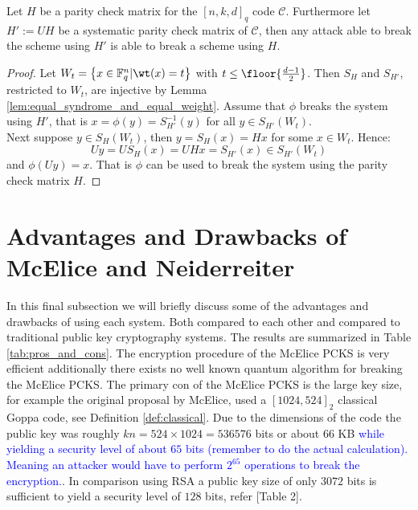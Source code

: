 \begin{proposition}\label{prop:H_can_be_in_standard_form}
  Let $H$ be a parity check matrix for the $[n, k, d]_q$ code $\mathcal{C}$. Furthermore let $H' := UH$ be a systematic parity check matrix of $\mathcal{C}$, then any attack able to break the scheme using $H'$ is able to break a scheme using $H$.
\end{proposition}
\begin{proof}
  Let $W_t = \left\{x \in \mathbb{F}_q^n | \wt(x) = t\right\}$ with $t \leq \floor{\frac{d - 1}{2}}$. Then $S_H$ and $S_{H'}$, restricted to $W_{t}$, are injective by Lemma \ref{lem:equal_syndrome_and_equal_weight}. Assume that $\phi$ breaks the system using $H'$, that is $x = \phi(y) = S_{H'}^{-1}(y)$ for all $y \in S_{H'}(W_t)$. \\
  Next suppose $y \in S_{H}(W_t)$, then $y = S_{H}(x) = Hx$ for some $x \in W_t$. Hence:
  \begin{equation*}
    Uy = U S_H(x) = U H x = S_{H'}(x) \in S_{H'}(W_t)
  \end{equation*}
   and $\phi(Uy) = x$. That is $\phi$ can be used to break the system using the parity check matrix $H$.
\end{proof}

\section{Advantages and Drawbacks of McElice and Neiderreiter}%
In this final subsection we will briefly discuss some of the advantages and drawbacks of using each system. Both compared to each other and compared to traditional public key cryptography systems. The results are summarized in Table \ref{tab:pros_and_cons}. The encryption procedure of the McElice PCKS is very efficient additionally there exists no well known quantum algorithm for breaking the McElice PCKS. The primary con of the McElice PCKS is the large key size, for example the original proposal by McElice, used a $[1024, 524]_2$ classical Goppa code, see Definition \ref{def:classical}. Due to the dimensions of the code the public key was roughly $kn = 524 \times 1024 = 536576$ bits or about $66$ KB \textcolor{blue}{while yielding a security level of about $65$ bits (remember to do the actual calculation). Meaning an attacker would have to perform $2^{65}$ operations to break the encryption.}. In comparison using RSA a public key size of only $3072$ bits is sufficient to yield a security level of $128$ bits, refer \cite{nist_recomendations_for_key_management}[Table 2].

